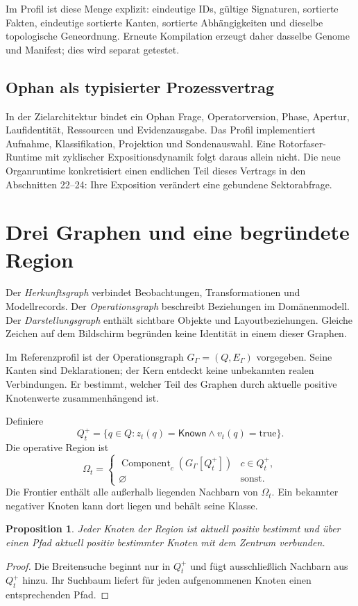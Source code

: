 \documentclass[11pt,a4paper]{article}
\newcommand{\Known}{\ensuremath{\mathsf{Known}}}
\newcommand{\nextsection}[2]{\clearpage{\color{accent}\small\textsf{#1}}\section{#2}}
\newtheorem{proposition}{Proposition}[section]
\begin{document}
Im Profil ist diese Menge explizit: eindeutige IDs, gültige
Signaturen, sortierte Fakten, eindeutige sortierte Kanten,
sortierte Abhängigkeiten und dieselbe topologische Geneordnung.
Erneute Kompilation erzeugt daher dasselbe Genome und Manifest;
dies wird separat getestet.

\subsection{Ophan als typisierter Prozessvertrag}
In der Zielarchitektur bindet ein Ophan Frage, Operatorversion,
Phase, Apertur, Laufidentität, Ressourcen und Evidenzausgabe.
Das Profil implementiert Aufnahme, Klassifikation, Projektion
und Sondenauswahl. Eine Rotorfaser-Runtime mit zyklischer
Expositionsdynamik folgt daraus allein nicht. Die neue Organruntime
konkretisiert einen endlichen Teil dieses Vertrags in den Abschnitten
22--24: Ihre Exposition verändert eine gebundene Sektorabfrage.

\nextsection{07 / KARTOGRAPHIE}{Drei Graphen und eine begründete Region}
Der \emph{Herkunftsgraph} verbindet Beobachtungen, Transformationen
und Modellrecords. Der \emph{Operationsgraph} beschreibt Beziehungen
im Domänenmodell. Der \emph{Darstellungsgraph} enthält sichtbare
Objekte und Layoutbeziehungen. Gleiche Zeichen auf dem Bildschirm
begründen keine Identität in einem dieser Graphen.

Im Referenzprofil ist der Operationsgraph $G_\Gamma=(Q,E_\Gamma)$
vorgegeben. Seine Kanten sind Deklarationen; der Kern entdeckt keine
unbekannten realen Verbindungen. Er bestimmt, welcher Teil des
Graphen durch aktuelle positive Knotenwerte zusammenhängend ist.

Definiere
\[
Q_t^+=\{q\in Q:z_t(q)=\Known\land v_t(q)=\mathrm{true}\}.
\]
Die operative Region ist
\[
\Omega_t=
\begin{cases}
\operatorname{Component}_c(G_\Gamma[Q_t^+]) & c\in Q_t^+,\\
\varnothing & \text{sonst}.
\end{cases}
\]
Die Frontier enthält alle außerhalb liegenden Nachbarn von $\Omega_t$.
Ein bekannter negativer Knoten kann dort liegen und behält seine Klasse.

\begin{proposition}
Jeder Knoten der Region ist aktuell positiv bestimmt und über
einen Pfad aktuell positiv bestimmter Knoten mit dem Zentrum verbunden.
\end{proposition}
\begin{proof}
Die Breitensuche beginnt nur in $Q_t^+$ und fügt ausschließlich
Nachbarn aus $Q_t^+$ hinzu. Ihr Suchbaum liefert für jeden
aufgenommenen Knoten einen entsprechenden Pfad.
\end{proof}
\end{document}

